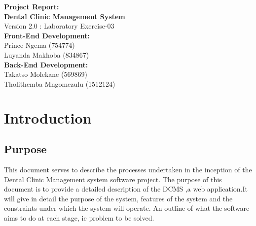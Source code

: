 \documentclass[11 pt]{article}
\begin{document}
\begin{titlepage}
\begin{center}
\huge{\bfseries{Project Report:}}\\
[2mm]
\huge{\bfseries{Dental Clinic Management System}}\\
Version 2.0 : Laboratory Exercise-03\\
\vskip 0.2in
\large{\bfseries{Front-End Development:}}\\
Prince Ngema (754774)\\
Luyanda Makhoba (834867) \\
\large{\bfseries{Back-End Development:}}\\
Takatso Molekane (569869)\\
Tholithemba Mngomezulu (1512124)\\
\end{center}
\end{titlepage}
\tableofcontents
\newpage
\section{Introduction}

\subsection{Purpose}
This document serves to describe the processes undertaken in the inception of the Dental Clinic Management system software project. The purpose of this document is to provide a detailed description of the DCMS ,a web application.It will give in detail the purpose of the system, features of the system and the constraints under which the system will operate. An outline of what the software aims to do at each stage, ie problem to be solved.
\end{document}
